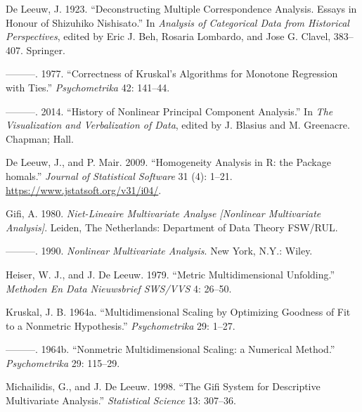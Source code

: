 \documentclass[
  12pt,
]{article}
\newlength{\cslhangindent}
\newenvironment{CSLReferences}[2] %
 {\begin{list}{}{%
  \setlength{\itemindent}{0pt}
  \setlength{\leftmargin}{0pt}
  \setlength{\parsep}{0pt}
  \ifodd #1
   \setlength{\leftmargin}{\cslhangindent}
   \setlength{\itemindent}{-1\cslhangindent}
  \fi
  \setlength{\itemsep}{#2\baselineskip}}}
 {\end{list}}
\begin{document}
\label{refs}
\begin{CSLReferences}{1}{0}
De Leeuw, J. 1923. {``Deconstructing Multiple Correspondence Analysis. Essays in Honour of Shizuhiko Nishisato.''} In \emph{Analysis of Categorical Data from Historical Perspectives}, edited by Eric J. Beh, Rosaria Lombardo, and Jose G. Clavel, 383--407. Springer.

---------. 1977. {``Correctness of Kruskal's Algorithms for Monotone Regression with Ties.''} \emph{Psychometrika} 42: 141--44.

---------. 2014. {``{History of Nonlinear Principal Component Analysis}.''} In \emph{{The Visualization and Verbalization of Data}}, edited by J. Blasius and M. Greenacre. Chapman; Hall.

De Leeuw, J., and P. Mair. 2009. {``{Homogeneity Analysis in {R}: the Package homals}.''} \emph{Journal of Statistical Software} 31 (4): 1--21. \url{https://www.jstatsoft.org/v31/i04/}.

Gifi, A. 1980. \emph{Niet-Lineaire Multivariate Analyse {[}Nonlinear Multivariate Analysis{]}}. Leiden, The Netherlands: Department of Data Theory FSW/RUL.

---------. 1990. \emph{Nonlinear Multivariate Analysis}. New York, N.Y.: Wiley.

Heiser, W. J., and J. De Leeuw. 1979. {``Metric Multidimensional Unfolding.''} \emph{Methoden En Data Nieuwsbrief SWS/VVS} 4: 26--50.

Kruskal, J. B. 1964a. {``{Multidimensional Scaling by Optimizing Goodness of Fit to a Nonmetric Hypothesis}.''} \emph{Psychometrika} 29: 1--27.

---------. 1964b. {``{Nonmetric Multidimensional Scaling: a Numerical Method}.''} \emph{Psychometrika} 29: 115--29.

Michailidis, G., and J. De Leeuw. 1998. {``The Gifi System for Descriptive Multivariate Analysis.''} \emph{Statistical Science} 13: 307--36.

\end{CSLReferences}
\end{document}
